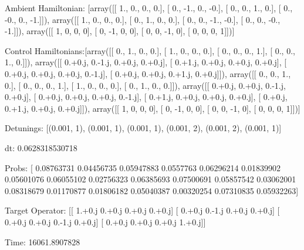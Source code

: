 \documentclass{article}
\begin{document}
    

\newpage

Ambient Hamiltonian: [array([[ 1.,  0.,  0.,  0.],
       [ 0., -1.,  0., -0.],
       [ 0.,  0.,  1.,  0.],
       [ 0., -0.,  0., -1.]]), array([[ 1.,  0.,  0.,  0.],
       [ 0.,  1.,  0.,  0.],
       [ 0.,  0., -1., -0.],
       [ 0.,  0., -0., -1.]]), array([[ 1,  0,  0,  0],
       [ 0, -1,  0,  0],
       [ 0,  0, -1,  0],
       [ 0,  0,  0,  1]])]

Control Hamiltonians:[array([[ 0.,  1.,  0.,  0.],
       [ 1.,  0.,  0.,  0.],
       [ 0.,  0.,  0.,  1.],
       [ 0.,  0.,  1.,  0.]]), array([[ 0.+0.j,  0.-1.j,  0.+0.j,  0.+0.j],
       [ 0.+1.j,  0.+0.j,  0.+0.j,  0.+0.j],
       [ 0.+0.j,  0.+0.j,  0.+0.j,  0.-1.j],
       [ 0.+0.j,  0.+0.j,  0.+1.j,  0.+0.j]]), array([[ 0.,  0.,  1.,  0.],
       [ 0.,  0.,  0.,  1.],
       [ 1.,  0.,  0.,  0.],
       [ 0.,  1.,  0.,  0.]]), array([[ 0.+0.j,  0.+0.j,  0.-1.j,  0.+0.j],
       [ 0.+0.j,  0.+0.j,  0.+0.j,  0.-1.j],
       [ 0.+1.j,  0.+0.j,  0.+0.j,  0.+0.j],
       [ 0.+0.j,  0.+1.j,  0.+0.j,  0.+0.j]]), array([[ 1,  0,  0,  0],
       [ 0, -1,  0,  0],
       [ 0,  0, -1,  0],
       [ 0,  0,  0,  1]])]

Detunings: [(0.001, 1), (0.001, 1), (0.001, 1), (0.001, 2), (0.001, 2), (0.001, 1)]

 dt: 0.0628318530718

Probs: [ 0.08763731  0.04456735  0.05947883  0.0557763   0.06296214  0.01839902
  0.05601076  0.06055102  0.02756323  0.06385693  0.07500691  0.05857542
  0.03062001  0.08318679  0.01170877  0.01806182  0.05040387  0.00320254
  0.07310835  0.05932263]

Target Operator: [[ 1.+0.j  0.+0.j  0.+0.j  0.+0.j]
 [ 0.+0.j  0.-1.j  0.+0.j  0.+0.j]
 [ 0.+0.j  0.+0.j  0.-1.j  0.+0.j]
 [ 0.+0.j  0.+0.j  0.+0.j  1.+0.j]]

Time: 16061.8907828
\end{document}
